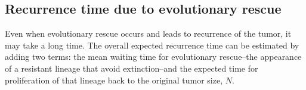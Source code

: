 \documentclass[12pt]{extarticle}
\begin{document}
%


\subsection*{Recurrence time due to evolutionary rescue}

Even when evolutionary rescue occurs and leads to recurrence of the tumor, it may take a long time.
The overall expected recurrence time can be estimated by adding two terms: the mean waiting time for evolutionary rescue--the appearance of a resistant lineage that avoid extinction--and the expected time for proliferation of that lineage back to the original tumor size, $N$.
\end{document}
